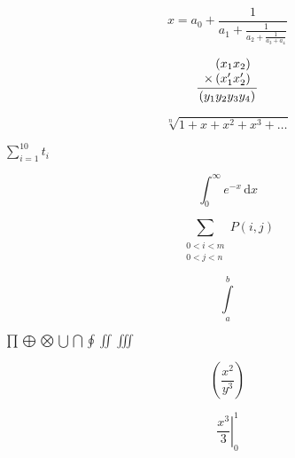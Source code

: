 \begin{frame}
\begin{LTXexample}
\begin{equation}
x = a_0 + \frac{1}{a_1 + \frac{1}{a_2 + \frac{1}{a_3 + a_4}}}
\end{equation}
\end{LTXexample}

\begin{LTXexample}
\begin{equation}
\frac{
    \begin{array}[b]{r}
      \left( x_1 x_2 \right)\\
      \times \left( x'_1 x'_2 \right)
    \end{array}
  }{
    \left( y_1y_2y_3y_4 \right)
  }
\end{equation}
\end{LTXexample}

\begin{LTXexample}
\begin{equation}
\sqrt[n]{1+x+x^2+x^3+\ldots}
\end{equation}
\end{LTXexample}

\begin{LTXexample}
\lipsum[1][1] $\sum_{i=1}^{10} t_i$ \lipsum[1][2]
\end{LTXexample}

\begin{LTXexample}
\lipsum[1][1] $$ \int_0^\infty e^{-x}\,\mathrm{d}x $$ \lipsum[1][2]
\end{LTXexample}

\begin{LTXexample}
\begin{equation}
 \sum_{\substack{
    0<i<m \\
    0<j<n
 }}
 P(i,j)
\end{equation}
\end{LTXexample}

\begin{LTXexample}
$$\int\limits_a^b$$
\end{LTXexample}

\begin{LTXexample}
$\prod \bigoplus \bigotimes \bigcup \bigcap \oint \iint \iiint$
\end{LTXexample}

\begin{LTXexample}
$$\left(\frac{x^2}{y^3}\right)$$
\end{LTXexample}

\begin{LTXexample}
$$\left.\frac{x^3}{3}\right|_0^1$$
\end{LTXexample}


\end{frame}
